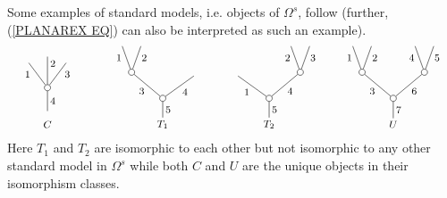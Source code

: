 \documentclass[a4paper,10pt]{article}%
\begin{document}
\begin{example}\label{STANDMODEL EX}
	Some examples of standard models, i.e. objects of $\Omega^s$, follow (further, (\ref{PLANAREX EQ}) can also be interpreted as such an example).
\begin{equation}\label{PLANAROMEGAEX1 EQ}
	\begin{tikzpicture}[grow=up,auto,level distance=2.1em,
	every node/.style = {font=\footnotesize,inner sep=2pt},
	dummy/.style={circle,draw,inner sep=0pt,minimum size=1.75mm}]
		\node at (-0.25,0) {$C$};
		\node at (-0.25,0.3) {}
			child{node [dummy] {}
				child[sibling distance = 1.5em,level distance= 2em]{
				edge from parent node [swap, near end] {$3$}}
				child[sibling distance = 1.5em,level distance= 2.5em]{
				edge from parent node [swap, near end] {$2$}}
				child[sibling distance = 1.5em,level distance= 2em]{
				edge from parent node [near end] {$1$}}
			edge from parent node [swap] {$4$}};
		\node at (3,0) {$T_1$}
			child{node [dummy] {}
				child[sibling distance = 5em, level distance=1.8em]{
				edge from parent node [swap] {$4$}}
				child[sibling distance = 5em]{node [dummy] {}
					child[sibling distance = 1.5em]{
					edge from parent node [swap,near end] {$2$}}
					child[sibling distance = 1.5em]{
					edge from parent node [near end] {$1$}}
				edge from parent node {$3$}}
			edge from parent node [swap] {$5$}};
		\node at (6,0) {$T_2$}
			child{node [dummy] {}
				child[sibling distance = 5em]{node [dummy] {}
					child[sibling distance = 1.5em]{
					edge from parent node [swap,near end] {$3$}}
					child[sibling distance = 1.5em]{
					edge from parent node [near end] {$2$}}
				edge from parent node [swap] {$4$}}
				child[sibling distance = 5em, level distance=1.8em]{
				edge from parent node {$1$}}
			edge from parent node [swap] {$5$}};
		\node at  (9.5,0) {$U$}
			child{node [dummy] {}
				child[sibling distance = 5em]{node [dummy] {}
					child[sibling distance = 1.5em]{
					edge from parent node [swap,near end] {$5$}}
					child[sibling distance = 1.5em]{
					edge from parent node [near end] {$4$}}
				edge from parent node [swap] {$6$}}
				child[sibling distance = 5em]{node [dummy] {}
					child[sibling distance = 1.5em]{
					edge from parent node [swap,near end] {$2$}}
					child[sibling distance = 1.5em]{
					edge from parent node [near end] {$1$}}
				edge from parent node {$3$}}
			edge from parent node [swap] {$7$}};
	\end{tikzpicture}
\end{equation}
Here $T_1$ and $T_2$ are isomorphic to each other but not isomorphic to any other standard model in $\Omega^s$ while both $C$ and $U$ are the unique objects in their isomorphism classes. 
\end{example}
\end{document}
